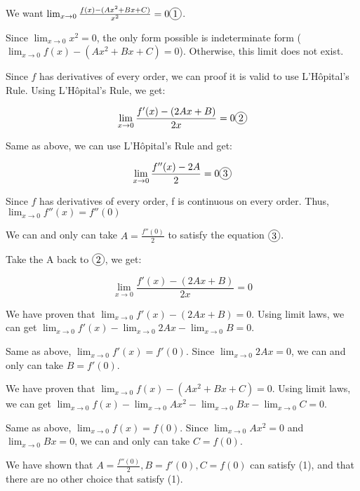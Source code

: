 \documentclass[12pt]{exam}
\newcommand*\circled[1]{\tikz[baseline=(char.base)]{
    \node[shape=circle, draw, inner sep=1pt, 
        minimum height=12pt] (char) {#1};}}
\begin{document}
\begin{enumerate}
\begin{enumerate}
			We want $\lim_{x \to 0} \frac{f(x) - (Ax^2 + Bx + C)}{x^2} = 0 \circled{1}$. 

			Since $\lim_{x \to 0} x^2 =0$, the only form possible is indeterminate form ($\lim_{x \to 0} f(x) - (Ax^2 + Bx + C) = 0$).
			Otherwise, this limit does not exist.

			Since $f$ has derivatives of every order, we can proof it is valid to use L'Hôpital's Rule. 
			Using L'Hôpital's Rule, we get:

			$$
				\lim_{x \to 0} \frac{f'(x) - (2Ax + B)}{2x} = 0 \circled{2}
			$$

			Same as above, we can use L'Hôpital's Rule and get:

			$$
				\lim_{x \to 0} \frac{f''(x) - 2A}{2} = 0 \circled{3}
			$$

			Since $f$ has derivatives of every order, f is continuous on every order. 
			Thus, $\lim_{x \to 0} f''(x) = f''(0)$

			We can and only can take $A = \frac{f''(0)}{2}$ to satisfy the equation $\circled{3}$.

			Take the A back to $\circled{2}$, we get:

			$$
				\lim_{x \to 0} \frac{f'(x) - (2Ax + B)}{2x} = 0
			$$

			We have proven that $\lim_{x \to 0} f'(x) - (2Ax + B) = 0$. 
			Using limit laws, we can get $\lim_{x \to 0} f'(x) - \lim_{x \to 0} 2Ax - \lim_{x \to 0}B = 0$.

			Same as above, $\lim_{x \to 0} f'(x) = f'(0)$. Since $\lim_{x \to 0} 2Ax = 0$, 
			we can and only can take $B = f'(0)$.

			We have proven that $\lim_{x \to 0} f(x) - (Ax^2 + Bx + C) = 0$.
			Using limit laws, we can get $\lim_{x \to 0} f(x) - \lim_{x \to 0}Ax^2 - \lim_{x \to 0}Bx - \lim_{x \to 0}C = 0$.

			Same as above, $\lim_{x \to 0} f(x) = f(0)$. Since $\lim_{x \to 0}Ax^2 = 0$ and $\lim_{x \to 0}Bx = 0$, 
			we can and only can take $C = f(0)$.

			We have shown that $A = \frac{f''(0)}{2}, B = f'(0), C = f(0)$ can satisfy (1), and that there are no other choice that satisfy (1).


\end{enumerate}
\end{enumerate}
\end{document}
